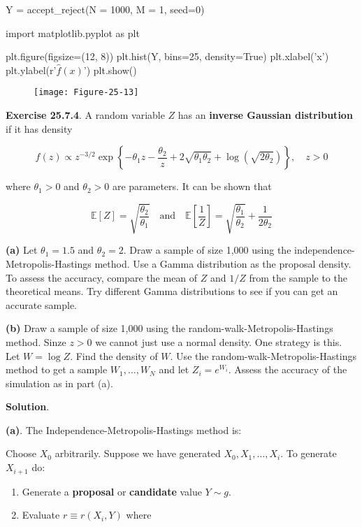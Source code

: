 \begin{python}
Y = accept_reject(N = 1000, M = 1, seed=0)

import matplotlib.pyplot as plt

plt.figure(figsize=(12, 8))
plt.hist(Y, bins=25, density=True)
plt.xlabel('x')
plt.ylabel(r'$\hat{f}(x)$')
plt.show()
\end{python}

\begin{figure}[H]
\texttt{[image: Figure-25-13]}
\end{figure}

\textbf{Exercise 25.7.4}. A random variable \(Z\) has an \textbf{inverse
Gaussian distribution} if it has density

\[ f(z) \propto z^{-3/2}  \exp \left\{ -\theta_1 z - \frac{\theta_2}{z} + 2 \sqrt{\theta_1 \theta_2}  + \log \left( \sqrt{2 \theta_2} \right) \right\}, \quad z > 0\]

where \(\theta_1 > 0\) and \(\theta_2 > 0\) are parameters. It can be
shown that

\[ 
\mathbb{E}[Z] = \sqrt{\frac{\theta_2}{\theta_1}} 
\quad \text{and} \quad
\mathbb{E}\left[ \frac{1}{Z} \right] = \sqrt{\frac{\theta_1}{\theta_2}} + \frac{1}{2 \theta_2}
\]

\textbf{(a)} Let \(\theta_1 = 1.5\) and \(\theta_2 = 2\). Draw a sample
of size 1,000 using the independence-Metropolis-Hastings method. Use a
Gamma distribution as the proposal density. To assess the accuracy,
compare the mean of \(Z\) and \(1 / Z\) from the sample to the
theoretical means. Try different Gamma distributions to see if you can
get an accurate sample.

\textbf{(b)} Draw a sample of size 1,000 using the
random-walk-Metropolis-Hastings method. Sinze \(z > 0\) we cannot just
use a normal density. One strategy is this. Let \(W = \log Z\). Find the
density of \(W\). Use the random-walk-Metropolis-Hastings method to get
a sample \(W_1, \dots, W_N\) and let \(Z_i = e^{W_i}\). Assess the
accuracy of the simulation as in part (a).

\textbf{Solution}.

\textbf{(a)}. The Independence-Metropolis-Hastings method is:

Choose \(X_0\) arbitrarily. Suppose we have generated
\(X_0, X_1, \dots, X_i\). To generate \(X_{i+1}\) do:

\begin{enumerate}[tightlist,label={\arabic*.}]
\item
  Generate a \textbf{proposal} or \textbf{candidate} value \(Y \sim g\).
\item
  Evaluate \(r \equiv r(X_i, Y)\) where
\end{enumerate}

